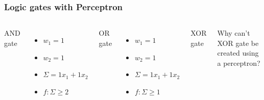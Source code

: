 \documentclass[aspectratio=169]{beamer}
\begin{document}
\begin{frame}
	\frametitle{Logic gates with Perceptron}
	\begin{columns}[t]
		{\large AND gate}

		\begin{itemize}
			\item $w_1 = 1$
			\item $w_2 = 1$
			\item $\Sigma = 1x_1 + 1x_2$
			\item $f: \Sigma \geq 2$
		\end{itemize}
		{\onslide<1-> \large OR gate}

		\begin{itemize}
			\item $w_1 = 1$
			\item $w_2 = 1$
			\item $\Sigma = 1x_1 + 1x_2$
			\item $f: \Sigma \geq 1$
		\end{itemize}
		{\onslide<1-> \large XOR gate}

		 Why can't XOR gate be created using a perceptron?
	\end{columns}
\end{frame}
\end{document}
